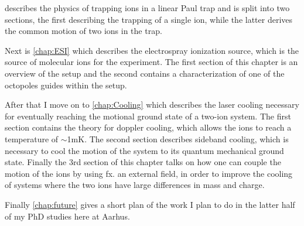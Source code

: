 describes the physics of trapping ions in a linear Paul trap and is split into two sections, the first describing the trapping of a single ion, while the latter derives the common motion of two ions in the trap.

Next is \cref*{chap:ESI} which describes the electrospray ionization source, which is the source of molecular ions for the experiment. The first section of this chapter is an overview of the setup and the second contains a characterization of one of the octopoles guides within the setup.

After that I move on to \cref*{chap:Cooling} which describes the laser cooling necessary for eventually reaching the motional ground state of a two-ion system. The first section contains the theory for doppler cooling, which allows the ions to reach a temperature of $\sim$1mK. The second section describes sideband cooling, which is necessary to cool the motion of the system to its quantum mechanical ground state. Finally the 3rd section of this chapter talks on how one can couple the motion of the ions by using fx. an external field, in order to improve the cooling of systems where the two ions have large differences in mass and charge.

Finally \cref*{chap:future} gives a short plan of the work I plan to do in the latter half of my PhD studies here at Aarhus.
